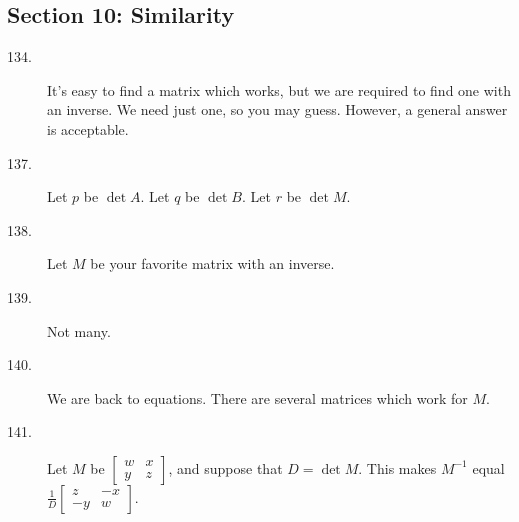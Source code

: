 \documentclass{article}
\begin{document}
\subsection*{Section 10: Similarity}

\begin{description}

  \item[134.] It's easy to find a matrix which works, but we are required to find one with an inverse. We need just one, so you may guess. However, a general answer is acceptable.

  \item[137.] Let $p$ be $\det A$. Let $q$ be $\det B$. Let $r$ be $\det M$.

  \item[138.] Let $M$ be your favorite matrix with an inverse.

  \item[139.] Not many.

  \item[140.] We are back to equations. There are several matrices which work for $M$.

  \item[141.] Let $M$ be $\begin{bmatrix} w & x \\ y & z \end{bmatrix}$, and suppose that $D = \det M$. This makes $M^{-1}$ equal $\frac{1}{D}  \begin{bmatrix} z & -x \\ -y & w \end{bmatrix}$.


\end{description}
\end{document}
